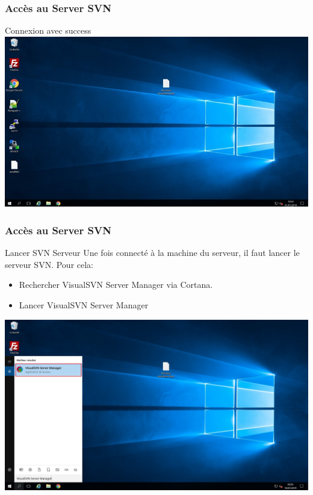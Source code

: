\documentclass{beamer}
\begin{document}
\begin{frame}
\frametitle{Accès au Server SVN }
Connexion avec success 
\newline
\newline
\includegraphics[scale=.6]{../images/server2.jpg}
\end{frame}

\begin{frame}
\frametitle{Accès au Server SVN }
\begin{block}{Lancer SVN Serveur}
Une fois connecté à la machine du serveur, il faut lancer le serveur SVN. Pour cela:
\begin{itemize}
\item  Rechercher \alert{VisualSVN Server Manager} via  Cortana.
\item Lancer \alert{VisualSVN Server Manager}
\end{itemize}
\end{block}
\includegraphics[scale=.2]{../images/server3.jpg}
\end{frame}
\end{document}
